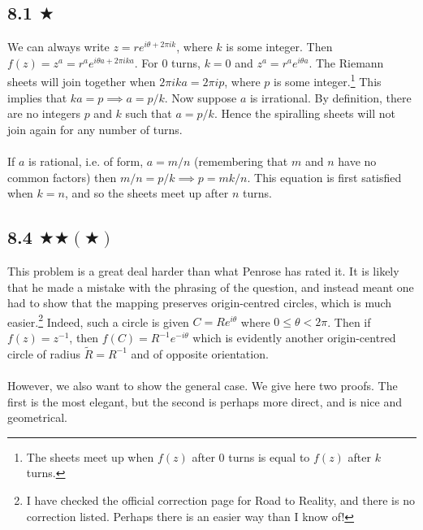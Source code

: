 

\subsection{8.1 $\bigstar$}
We can always write $z=re^{i\theta+2\pi i k}$, where $k$ is some integer. Then $f(z)=z^a=r^a e^{i\theta a+2\pi i ka}$. For 0 turns, $k=0$ and $z^a=r^a e^{i\theta a}$. The Riemann sheets will join together when $2\pi i ka=2\pi i p$, where $p$ is some integer.\footnote{The sheets meet up when $f(z)$ after 0 turns is equal to $f(z)$ after $k$ turns.} This implies that $ka=p\implies a=p/k$. Now suppose $a$ is irrational. By definition, there are no integers $p$ and $k$ such that $a=p/k$. Hence the spiralling sheets will not join again for any number of turns.  \\ \\  
If $a$ is rational, i.e. of form, $a=m/n$ (remembering that $m$ and $n$ have no common factors) then $m/n=p/k\implies p=mk/n$. This equation is first satisfied when $k=n$, and so the sheets meet up after $n$ turns.


\subsection{8.4 $\bigstar \bigstar (\bigstar)$}
This problem is a great deal harder than what Penrose has rated it. It is likely that he made a mistake with the phrasing of the question, and instead meant one had to show that the mapping preserves origin-centred circles, which is much easier.\footnote{I have checked the official correction page for Road to Reality, and there is no correction listed. Perhaps there is an easier way than I know of!}  Indeed, such a circle is given $C=Re^{i\theta}$ where $0\leq\theta<2\pi$. Then if $f(z)=z^{-1}$, then $f(C)=R^{-1}e^{-i\theta}$ which is evidently another origin-centred circle of radius $\tilde{R}=R^{-1}$ and of opposite orientation.\\ \\ 
However, we also want to show the general case. We give here two proofs. The first is the most elegant, but the second is perhaps more direct, and is nice and geometrical.

